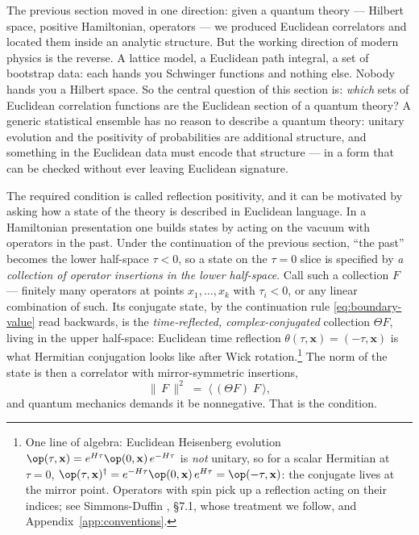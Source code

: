 The previous section moved in one direction: given a quantum theory ---
Hilbert space, positive Hamiltonian, operators --- we produced Euclidean
correlators and located them inside an analytic structure. But the working
direction of modern physics is the reverse. A lattice model, a Euclidean path
integral, a set of bootstrap data: each hands you Schwinger functions and
nothing else. Nobody hands you a Hilbert space. So the central question of
this section is: \emph{which} sets of
Euclidean correlation functions are the Euclidean section of a quantum
theory? A generic statistical ensemble has no reason to describe a quantum
theory: unitary evolution and the positivity of probabilities are additional
structure, and something in the Euclidean data must encode that structure ---
in a form that can be checked without ever leaving Euclidean signature.

The required condition is called reflection positivity, and it can be
motivated by asking how a state of the theory is described in Euclidean
language. In a Hamiltonian presentation one builds states by acting on the
vacuum with operators in the past. Under the continuation of the previous
section, ``the past'' becomes the lower half-space $\tau < 0$, so a state on
the $\tau = 0$ slice is specified by
\emph{a collection of operator insertions in the lower half-space}.
Call such a collection $F$ --- finitely many operators at points $x_1, \dots,
x_k$ with $\tau_i < 0$, or any linear combination of such. Its conjugate state,
by the continuation rule \eqref{eq:boundary-value} read backwards, is the
\emph{time-reflected, complex-conjugated} collection $\Theta F$, living in the
upper half-space: Euclidean time reflection $\theta(\tau, \mathbf{x}) = (-\tau,
\mathbf{x})$ is what Hermitian conjugation looks like after Wick
rotation.\footnote{One line of algebra: Euclidean Heisenberg evolution
$\op(\tau, \mathbf{x}) = e^{H\tau}\op(0,\mathbf{x})\,e^{-H\tau}$ is \emph{not}
unitary, so for a scalar Hermitian at $\tau = 0$,
$\op(\tau, \mathbf{x})^\dagger = e^{-H\tau}\op(0,\mathbf{x})\,e^{H\tau} =
\op(-\tau, \mathbf{x})$: the conjugate lives at the mirror point. Operators with
spin pick up a reflection acting on their indices; see Simmons-Duffin
, \S7.1, whose treatment we follow, and
Appendix~\ref{app:conventions}.} The norm of the state is then a correlator with
mirror-symmetric insertions,
\begin{equation}
\big\| \,F\, \big\|^2 \;=\; \big\langle\, (\Theta F)\; F \,\big\rangle ,
\label{eq:rp-norm}
\end{equation}
and quantum mechanics demands it be nonnegative. That is the condition.

